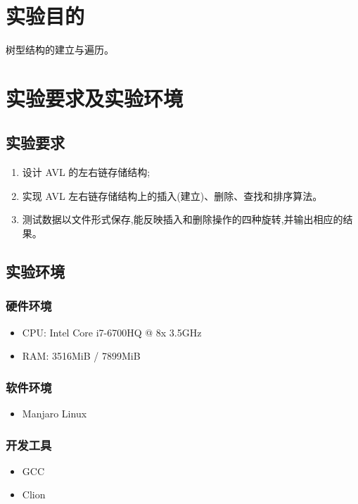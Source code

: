 \section{实验目的}
树型结构的建立与遍历。

\section{实验要求及实验环境}
\subsection{实验要求}
\begin{enumerate}
    \item 设计 AVL 的左右链存储结构;
    \item 实现 AVL 左右链存储结构上的插入(建立)、删除、查找和排序算法。
    \item 测试数据以文件形式保存,能反映插入和删除操作的四种旋转,并输出相应的结果。
\end{enumerate}

\subsection{实验环境}
\subsubsection{硬件环境}
\begin{itemize}
    \item CPU: Intel Core i7-6700HQ @ 8x 3.5GHz
    \item RAM: 3516MiB / 7899MiB
\end{itemize}

\subsubsection{软件环境}
\begin{itemize}
    \item Manjaro Linux
\end{itemize}

\subsubsection{开发工具}
\begin{itemize}
    \item GCC
    \item Clion
\end{itemize}